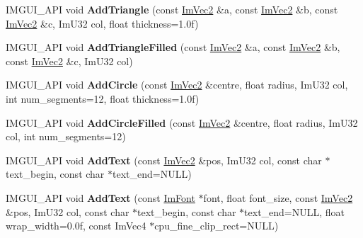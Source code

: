 \begin{DoxyCompactItemize}
\mbox{\label{struct_im_draw_list_ad04c8e04644b1cf54c7c7b8f352d5e41}} 
I\+M\+G\+U\+I\+\_\+\+A\+PI void {\bfseries Add\+Triangle} (const \hyperlink{struct_im_vec2}{Im\+Vec2} \&a, const \hyperlink{struct_im_vec2}{Im\+Vec2} \&b, const \hyperlink{struct_im_vec2}{Im\+Vec2} \&c, Im\+U32 col, float thickness=1.\+0f)
\item 
\mbox{\label{struct_im_draw_list_a2395370cf2dab19fce3c0e2542cd4f25}} 
I\+M\+G\+U\+I\+\_\+\+A\+PI void {\bfseries Add\+Triangle\+Filled} (const \hyperlink{struct_im_vec2}{Im\+Vec2} \&a, const \hyperlink{struct_im_vec2}{Im\+Vec2} \&b, const \hyperlink{struct_im_vec2}{Im\+Vec2} \&c, Im\+U32 col)
\item 
\mbox{\label{struct_im_draw_list_a26c34a87eca6aefa02ca4e4951dcd170}} 
I\+M\+G\+U\+I\+\_\+\+A\+PI void {\bfseries Add\+Circle} (const \hyperlink{struct_im_vec2}{Im\+Vec2} \&centre, float radius, Im\+U32 col, int num\+\_\+segments=12, float thickness=1.\+0f)
\item 
\mbox{\label{struct_im_draw_list_a293e87d22e17587e3994cf6deb20be45}} 
I\+M\+G\+U\+I\+\_\+\+A\+PI void {\bfseries Add\+Circle\+Filled} (const \hyperlink{struct_im_vec2}{Im\+Vec2} \&centre, float radius, Im\+U32 col, int num\+\_\+segments=12)
\item 
\mbox{\label{struct_im_draw_list_ac5221bd86b3429f6d5b6e6ffe454942d}} 
I\+M\+G\+U\+I\+\_\+\+A\+PI void {\bfseries Add\+Text} (const \hyperlink{struct_im_vec2}{Im\+Vec2} \&pos, Im\+U32 col, const char $\ast$text\+\_\+begin, const char $\ast$text\+\_\+end=N\+U\+LL)
\item 
\mbox{\label{struct_im_draw_list_a0a226cbe9bb1480428e145d8535cda26}} 
I\+M\+G\+U\+I\+\_\+\+A\+PI void {\bfseries Add\+Text} (const \hyperlink{struct_im_font}{Im\+Font} $\ast$font, float font\+\_\+size, const \hyperlink{struct_im_vec2}{Im\+Vec2} \&pos, Im\+U32 col, const char $\ast$text\+\_\+begin, const char $\ast$text\+\_\+end=N\+U\+LL, float wrap\+\_\+width=0.\+0f, const Im\+Vec4 $\ast$cpu\+\_\+fine\+\_\+clip\+\_\+rect=\+N\+U\+L\+L)
\item 
\mbox{\label{struct_im_draw_list_ac37cd998bf5f40705c7445004a029b66}} 

\end{DoxyCompactItemize}
